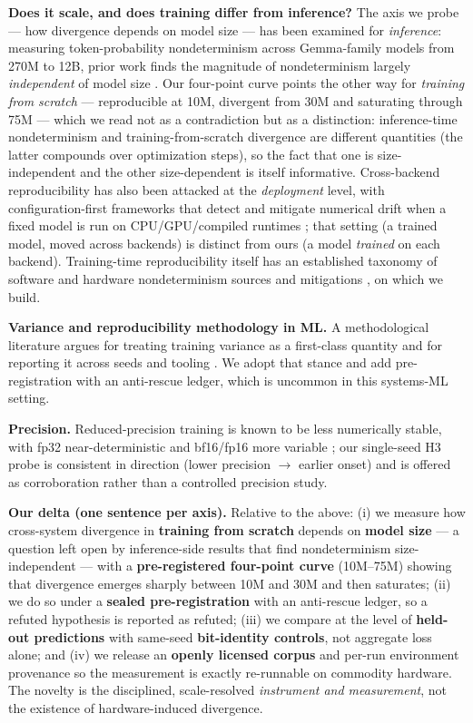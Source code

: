 \documentclass{article}
\begin{document}
\textbf{Does it scale, and does training differ from inference?} The axis we probe --- how
divergence depends on model size --- has been examined for \emph{inference}: measuring token-probability
nondeterminism across Gemma-family models from 270M to 12B, prior work finds the magnitude of
nondeterminism largely \emph{independent} of model size \citep{fu2026beyond}. Our four-point curve points
the other way for \emph{training from scratch} --- reproducible at 10M, divergent from 30M and
saturating through 75M --- which we read not as a contradiction but as a distinction:
inference-time nondeterminism and training-from-scratch divergence are different quantities (the
latter compounds over optimization steps), so the fact that one is size-independent and the
other size-dependent is itself informative. Cross-backend reproducibility has also been
attacked at the \emph{deployment} level, with configuration-first frameworks that detect and mitigate
numerical drift when a fixed model is run on CPU/GPU/compiled runtimes \citep{li2025crossbackend};
that setting (a trained model, moved across backends) is distinct from ours (a model \emph{trained}
on each backend). Training-time reproducibility itself has an established taxonomy of software
and hardware nondeterminism sources and mitigations \citep{chen2022trainrepro}, on which we build.

\textbf{Variance and reproducibility methodology in ML.} A methodological literature argues for
treating training variance as a first-class quantity and for reporting it across seeds and
tooling \citep{bouthillier2021,henderson2018,pineau2021}. We adopt that stance and add
pre-registration with an anti-rescue ledger, which is uncommon in this systems-ML setting.

\textbf{Precision.} Reduced-precision training is known to be less numerically stable, with fp32
near-deterministic and bf16/fp16 more variable \citep{shanmugavelu2024fpna,yuan2025llminfer}; our single-seed H3
probe is consistent in direction (lower precision $\rightarrow$ earlier onset) and is offered as
corroboration rather than a controlled precision study.

\textbf{Our delta (one sentence per axis).} Relative to the above: (i) we measure how cross-system
divergence in \textbf{training from scratch} depends on \textbf{model size} --- a question left open by
inference-side results that find nondeterminism size-independent \citep{fu2026beyond} --- with a
\textbf{pre-registered four-point curve} (10M--75M) showing that divergence emerges sharply between
10M and 30M and then saturates; (ii) we do so under a \textbf{sealed pre-registration} with an
anti-rescue ledger, so a refuted hypothesis is reported as refuted; (iii) we compare at the
level of \textbf{held-out predictions} with same-seed \textbf{bit-identity controls}, not aggregate loss
alone; and (iv) we release an \textbf{openly licensed corpus} and per-run environment provenance so
the measurement is exactly re-runnable on commodity hardware. The novelty is the disciplined,
scale-resolved \emph{instrument and measurement}, not the existence of hardware-induced divergence.
\end{document}
